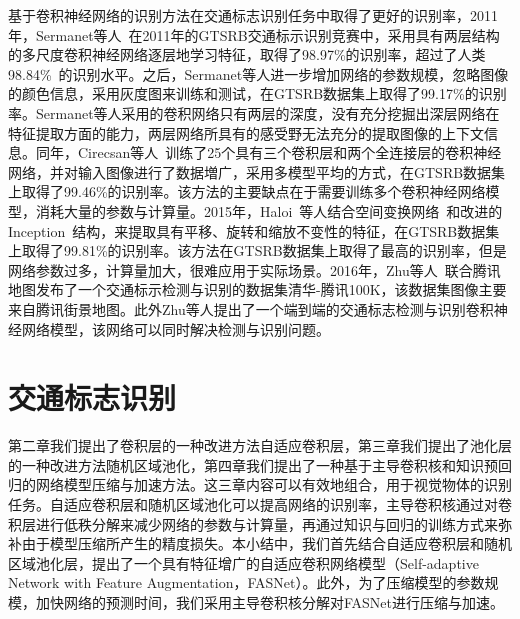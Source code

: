 基于卷积神经网络的识别方法在交通标志识别任务中取得了更好的识别率，2011年，Sermanet等人~\cite{sermanet2011traffic}在2011年的GTSRB交通标示识别竞赛中，采用具有两层结构的多尺度卷积神经网络逐层地学习特征，取得了98.97\%的识别率，超过了人类98.84\%~\cite{stallkamp2011german}的识别水平。之后，Sermanet等人进一步增加网络的参数规模，忽略图像的颜色信息，采用灰度图来训练和测试，在GTSRB数据集上取得了99.17\%的识别率。Sermanet等人采用的卷积网络只有两层的深度，没有充分挖掘出深层网络在特征提取方面的能力，两层网络所具有的感受野无法充分的提取图像的上下文信息。同年，Cirecsan等人~\cite{cirecsan2011committee}训练了25个具有三个卷积层和两个全连接层的卷积神经网络，并对输入图像进行了数据増广，采用多模型平均的方式，在GTSRB数据集上取得了99.46\%的识别率。该方法的主要缺点在于需要训练多个卷积神经网络模型，消耗大量的参数与计算量。2015年，Haloi~\cite{haloi2015traffic}等人结合空间变换网络~\cite{jaderberg2015spatial}和改进的Inception~\cite{szegedy2014going,szegedy2015rethinking,szegedy2016inception}结构，来提取具有平移、旋转和缩放不变性的特征，在GTSRB数据集上取得了99.81\%的识别率。该方法在GTSRB数据集上取得了最高的识别率，但是网络参数过多，计算量加大，很难应用于实际场景。2016年，Zhu等人~\cite{zhu2016traffic}联合腾讯地图发布了一个交通标示检测与识别的数据集清华-腾讯100K，该数据集图像主要来自腾讯街景地图。此外Zhu等人提出了一个端到端的交通标志检测与识别卷积神经网络模型，该网络可以同时解决检测与识别问题。

\section{交通标志识别}
\label{sec:seg:model}

第二章我们提出了卷积层的一种改进方法自适应卷积层，第三章我们提出了池化层的一种改进方法随机区域池化，第四章我们提出了一种基于主导卷积核和知识预回归的网络模型压缩与加速方法。这三章内容可以有效地组合，用于视觉物体的识别任务。自适应卷积层和随机区域池化可以提高网络的识别率，主导卷积核通过对卷积层进行低秩分解来减少网络的参数与计算量，再通过知识与回归的训练方式来弥补由于模型压缩所产生的精度损失。本小结中，我们首先结合自适应卷积层和随机区域池化层，提出了一个具有特征增广的自适应卷积网络模型（Self-adaptive Network with Feature Augmentation，FASNet）。此外，为了压缩模型的参数规模，加快网络的预测时间，我们采用主导卷积核分解对FASNet进行压缩与加速。


